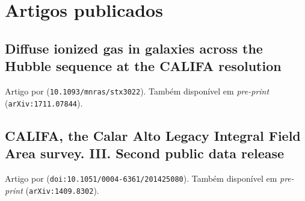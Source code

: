 


\chapter{Artigos publicados}

\section{Diffuse ionized gas in galaxies across the Hubble sequence at the CALIFA resolution}
\label{apendice:DIGpaper0}

Artigo por \cite{Lacerda.etal.2018} (\texttt{10.1093/mnras/stx3022}).
Também disponível em {\em pre-print} (\texttt{arXiv:1711.07844}).

\cleardoublepage



\section{CALIFA, the Calar Alto Legacy Integral Field Area survey. III. Second public data release}
\label{apendice:GBetal2015a}

Artigo por \cite{GarciaBenito.etal.2015a} (\texttt{doi:10.1051/0004-6361/201425080}).
Também disponível em {\em pre-print} (\texttt{arXiv:1409.8302}).

\cleardoublepage



%
%
%
% 
%
%
%
%
% 


